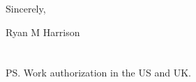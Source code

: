 \documentclass{../res}
\begin{document}
\begin{sloppypar}
\begin{resume}
\vspace{1\baselineskip}
Sincerely,
\vspace{2\baselineskip}

Ryan M Harrison \\ \\ \\
PS. Work authorization in the US and UK.

\end{resume} 
\end{sloppypar}
\end{document}

